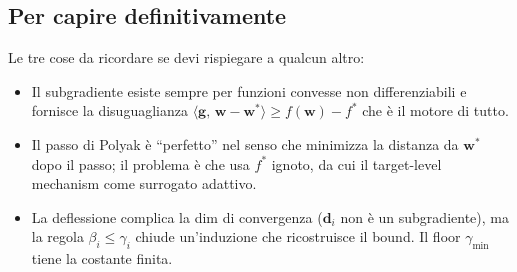 \documentclass[11pt,a4paper]{article}
\newcommand{\inner}[2]{\langle #1,\,#2\rangle}
\newcommand{\bw}{\mathbf{w}}
\newcommand{\bg}{\mathbf{g}}
\newcommand{\bd}{\mathbf{d}}
\theoremstyle{definition}
\begin{document}
\subsection{Per capire definitivamente}

Le tre cose da ricordare se devi rispiegare a qualcun altro:

\begin{itemize}[leftmargin=*]
\item Il subgradiente esiste sempre per funzioni convesse non differenziabili e fornisce la disuguaglianza $\inner{\bg}{\bw-\bw^*}\ge f(\bw)-f^*$ che è il motore di tutto.
\item Il passo di Polyak è ``perfetto'' nel senso che minimizza la distanza da $\bw^*$ dopo il passo; il problema è che usa $f^*$ ignoto, da cui il target-level mechanism come surrogato adattivo.
\item La deflessione complica la dim di convergenza ($\bd_i$ non è un subgradiente), ma la regola $\beta_i\le\gamma_i$ chiude un'induzione che ricostruisce il bound. Il floor $\gamma_{\min}$ tiene la costante finita.
\end{itemize}
\end{document}
